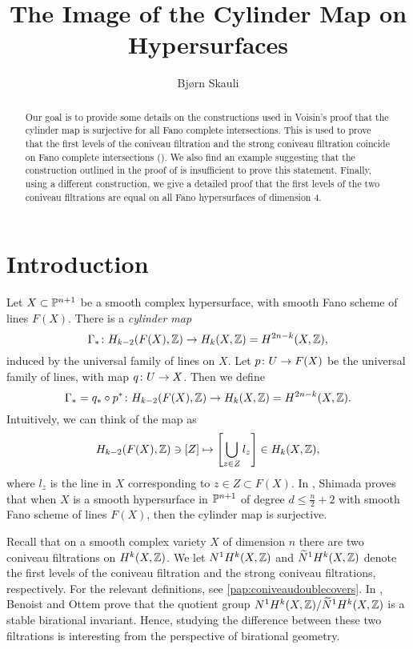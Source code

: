 \title{The Image of the Cylinder Map on Hypersurfaces}
\author{Bjørn Skauli}
\date{}

	\maketitle

\label{pap:coniveauhypersurfaces}
        \begin{abstract}
          Our goal is to provide some details on the constructions used in Voisin's proof that the cylinder map is surjective for all Fano complete intersections. This is used to prove that the first levels of the coniveau filtration and the strong coniveau filtration coincide on Fano complete intersections  (\cite[Theorem 1.13]{VoisinConiveauThreefolds}). We also find an example suggesting that the construction outlined in the proof of \cite{VoisinConiveauThreefolds} is insufficient to prove this statement. Finally, using a different construction, we give a detailed proof that the first levels of the two coniveau filtrations are equal on all Fano hypersurfaces of dimension 4.
        \end{abstract}
	
\section{Introduction}
Let $X \subset \P^{n+1}$ be a smooth complex hypersurface, with smooth Fano scheme of lines $F(X)$. There is a \emph{cylinder map} 
\[\Gamma_* \from H_{k-2}(F(X),\Z) \to H_k(X,\Z) = H^{2n-k}(X,\Z), \]
induced by the universal family of lines on $X$. Let $p \from U \to F(X)$ be the universal family of lines, with map $q \from U \to X$. Then we define 
\[ \Gamma_* = q_* \circ p^* \from H_{k-2}(F(X),\Z) \to H_k(X,\Z) = H^{2n-k}(X,\Z).\]
Intuitively, we can think of the map as
\[H_{k-2}(F(X),\Z) \ni [Z] \mapsto \left[\bigcup_{z \in Z} l_z\right] \in H_k(X,\Z), \]
where $l_z$ is the line in $X$ corresponding to $z \in Z \subset F(X)$. In \cite{ShimadaHypersurfaces}, Shimada proves that when $X$ is a smooth hypersurface  in $\P^{n+1}$ of degree $d \leq \frac{n}{2}+2$ with smooth Fano scheme of lines $F(X)$, then the cylinder map is surjective.

Recall that on a smooth complex variety $X$ of dimension $n$ there are two coniveau filtrations on $H^k(X,\Z)$. We let $N^1H^k(X,\Z)$ and $\widetilde{N}^1H^k(X,\Z)$ denote the first levels of the coniveau filtration and the strong coniveau filtrations, respectively. For the relevant definitions, see \cref{pap:coniveaudoublecovers}. In \cite[Proposition 2.4]{BenoistOttemConiveau}, Benoist and Ottem prove that the quotient group $N^1H^k(X,\Z) / \widetilde{N}^1H^k(X,\Z)$ is a stable birational invariant. Hence, studying the difference between these two filtrations is interesting from the perspective of birational geometry.

